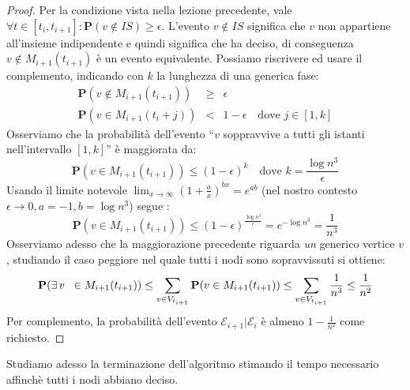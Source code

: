 \documentclass{article}
\begin{document}
\begin{proof}
    Per la condizione vista nella lezione precedente, vale 
    $\forall t \in [t_i,t_{i+1}]: \mathbf{P}(v \not \in IS) \geq \epsilon$. 
    L'evento $v \not \in IS$ significa che $v$ non appartiene all'insieme
    indipendente e quindi significa che ha deciso, di conseguenza 
    $v \not \in M_{i+1}(t_{i+1})$ \`e un evento equivalente. Possiamo
    riscrivere ed usare il complemento, indicando con $k$ la lunghezza
    di una generica fase:
    \begin{displaymath}
    \begin{array} {lcl} 
        \mathbf{P}(v \not \in M_{i+1}(t_{i+1})) & \geq & \epsilon \\
        \mathbf{P}(v \in M_{i+1}(t_i + j)) & < & 1-\epsilon \quad 
            \text{dove } j\in[1,k]
    \end{array}
    \end{displaymath}
    Osserviamo che la probabilit\`a dell'evento ``$v$ soppravvive a tutti
    gli istanti nell'intervallo $[1,k]$'' \`e maggiorata da:
    \begin{displaymath}
        \mathbf{P}(v \in M_{i+1}(t_{i+1})) \leq (1 - \epsilon)^k 
            \quad \text{dove } k = \frac{\log{n}^3}{\epsilon}
    \end{displaymath}
    Usando il limite notevole $\lim_{x \rightarrow \infty}{(1 + 
    \frac{a}{x})^{bx}} = e^{ab}$ (nel nostro contesto $\epsilon \rightarrow 0
    , a = -1, b = \log{n^3}$)
    segue :
    \begin{displaymath}
        \mathbf{P}(v \in M_{i+1}(t_{i+1})) \leq (1 - \epsilon)^
        \frac{\log{n}^3}{\epsilon} = e^{-\log{n}^3} = \frac{1}{n^3}
    \end{displaymath}
    Osserviamo adesso che la maggiorazione precedente riguarda \emph{un}
    generico vertice $v$, studiando il caso peggiore nel quale tutti i 
    nodi sono sopravvissuti si ottiene:
    \begin{displaymath}
        \mathbf{P}(\exists\,v\;\; \in M_{i+1}(t_{i+1})) \leq 
        \sum_{v \in V_{t_{i+1}}}{\mathbf{P}(v \in M_{i+1}(t_{i+1}))} \leq
        \sum_{v \in V_{t_{i+1}}}{\frac{1}{n^3}} \leq
        \frac{1}{n^2}
    \end{displaymath}
    Per complemento, la probabilit\`a dell'evento $\mathcal{E}_{i+1}|
    \mathcal{E}_i$ \`e almeno $1 - \frac{1}{n^2}$ come richiesto.
\end{proof}

Studiamo adesso la terminazione dell'algoritmo stimando il tempo necessario
affinch\`e tutti i nodi abbiano deciso.
\end{document}
